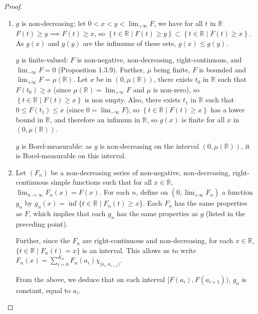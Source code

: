 \documentclass[11pt,a4paper,twoside]{article}
\begin{document}
\begin{proof}\hfill
  \begin{enumerate}
  \item
    $g$ is non-decreasing: let $0<x<y<\lim_{+\infty} F$,
    we have for all $t$ in $\mathbb{R}$ $F(t)\geq y \implies F(t)\geq
    x$, so $\left\{ t\in\mathbb{R} \mid F(t)\geq y\right\} \subset
    \left\{ t\in\mathbb{R} \mid F(t)\geq x\right\}$. As $g(x)$ and $g(y)$
    are the infimums of these sets, $g(x)\leq g(y)$.

    $g$ is finite-valued: $F$ is non-negative, non-decreasing,
    right-continuous, and $\lim_{-\infty}F = 0$ (Proposition
    1.3.9). Further, $\mu$ being finite, $F$ is bounded and
    $\lim_{+\infty}F = \mu(\mathbb{R})$. Let $x$ be in
    $\left(0,\mu\left(\mathbb{R}\right)\right)$, there exists $t_0$ in
    $\mathbb{R}$ such that $F(t_0)\geq x$ (since $\mu(\mathbb{R}) =
    \lim_{+\infty}F$ and $\mu$ is non-zero), so $\left\{
    t\in\mathbb{R} \mid F(t)\geq x \right\}$ is non empty. Also, there
    exists $t_1$ in $\mathbb{R}$ such that $0\leq F(t_1)\leq x$ (since
    $0 = \lim_{-\infty}F$), so $\left\{ t\in\mathbb{R} \mid F(t)\geq x
    \right\}$ has a lower bound in $\mathbb{R}$, and therefore an
    infimum in $\mathbb{R}$, so $g(x)$ is finite for all $x$ in $(0,
    \mu(\mathbb{R}))$.

    $g$ is Borel-measurable: as $g$ is non-decreasing on the interval
    $(0, \mu(\mathbb{R}))$, it is Borel-measurable on this interval.

  \item

    Let $(F_n)$ be a non-decreasing series of non-negative,
    non-decreasing, right-continuous simple functions such that for
    all $x\in\mathbb{R}$, $\lim_{n \to \infty} F_n (x) = F (x)$. For
    each $n$, define on $(0, \lim_{+\infty} F_n)$ a function $g_n$ by
    $g_n (x) = \inf \{ t \in \mathbb{R} \mid F_n (t) \geq x \}$. Each
    $F_n$ has the same properties as $F$, which implies that each
    $g_n$ has the same properties as $g$ (listed in the preceding
    point).

    Further, since the $F_n$ are right-continuous and non-decreasing,
    for each $x \in \mathbb{R}$, $\{ t \in \mathbb{R} \mid F_n (t) = x
    \}$ is an interval. This allows us to write $F_n (x) = \sum_{i =
      0}^{K_n} F_n (a_i) \chi_{[a_i, a_{i + 1})}$.

    From the above, we deduce that on each interval $[F (a_i), F (a_{i
        + 1}))$, $g_n$ is constant, equal to $a_i$.


\end{enumerate}
\end{proof}
\end{document}

